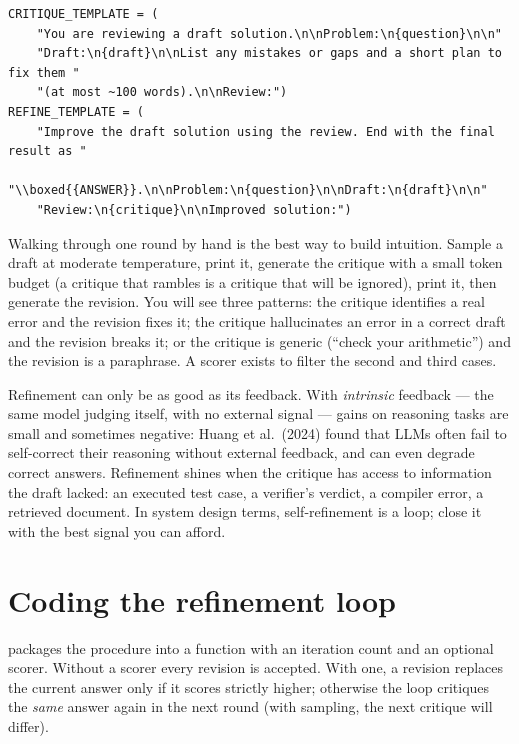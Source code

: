 \begin{lstlisting}[caption={Critique and refine templates (\texttt{llmsys/tts.py}).},label={lst:refine:templates}]
CRITIQUE_TEMPLATE = (
    "You are reviewing a draft solution.\n\nProblem:\n{question}\n\n"
    "Draft:\n{draft}\n\nList any mistakes or gaps and a short plan to fix them "
    "(at most ~100 words).\n\nReview:")
REFINE_TEMPLATE = (
    "Improve the draft solution using the review. End with the final result as "
    "\\boxed{{ANSWER}}.\n\nProblem:\n{question}\n\nDraft:\n{draft}\n\n"
    "Review:\n{critique}\n\nImproved solution:")
\end{lstlisting}

Walking through one round by hand is the best way to build intuition. Sample a draft at moderate
temperature, print it, generate the critique with a small token budget (a critique that rambles is a
critique that will be ignored), print it, then generate the revision. You will see three patterns:
the critique identifies a real error and the revision fixes it; the critique hallucinates an error
in a correct draft and the revision breaks it; or the critique is generic (``check your arithmetic'')
and the revision is a paraphrase. A scorer exists to filter the second and third cases.

\begin{keyidea}
Refinement can only be as good as its feedback. With \emph{intrinsic} feedback --- the same model
judging itself, with no external signal --- gains on reasoning tasks are small and sometimes negative:
Huang et al.\ (2024) found that LLMs often fail to self-correct their reasoning without external
feedback, and can even degrade correct answers. Refinement shines when the critique has access to
information the draft lacked: an executed test case, a verifier's verdict, a compiler error, a
retrieved document. In system design terms, self-refinement is a loop; close it with the best
signal you can afford.
\end{keyidea}

\section{Coding the refinement loop}\label{sec:refine:loopcode}

 packages the procedure into a function with an iteration count and an optional
scorer. Without a scorer every revision is accepted. With one, a revision replaces the current answer
only if it scores strictly higher; otherwise the loop critiques the \emph{same} answer again in the
next round (with sampling, the next critique will differ).

